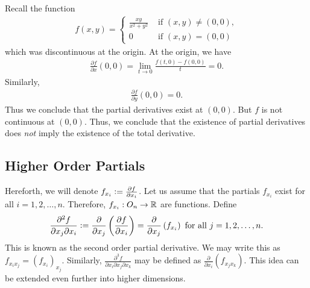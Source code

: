 \begin{example}
    Recall the function
    \begin{align}
        f(x,y) = \begin{cases}
            \frac{xy}{x^{2}+y^{2}} &\text{ if } (x,y) \neq (0,0),\\
            0 &\text{ if } (x,y) = (0,0)
        \end{cases}
    \end{align}
    which was discontinuous at the origin. At the origin, we have
    \begin{align}
        \frac{\partial f}{\partial x}(0,0) = \lim_{t \to 0} \frac{f(t,0)-f(0,0)}{t} = 0.
    \end{align}
    Similarly,
    \begin{align}
        \frac{\partial f}{\partial y}(0,0) = 0.
    \end{align}
    Thus we conclude that the partial derivatives exist at $(0,0)$. But $f$ is not continuous at $(0,0)$. Thus, we conclude that the existence of partial derivatives does \textit{not} imply the existence of the total derivative.
\end{example}


\subsection{Higher Order Partials}
Hereforth, we will denote $f_{x_{i}} \vcentcolon= \frac{\partial f}{\partial x_{i}}$. Let us assume that the partials $f_{x_{i}}$ exist for all $i = 1,2,\ldots,n$. Therefore, $f_{x_{i}} : O_{n} \to \mathbb{R}$ are functions. Define
\begin{align}
    \frac{\partial^{2} f}{\partial x_{j} \partial x_{i}} \vcentcolon= \frac{\partial}{\partial x_{j}} \left( \frac{\partial f}{\partial x_{i}} \right) = \frac{\partial}{\partial x_{j}} \left( f_{x_{i}} \right) \text{ for all } j = 1,2,\ldots,n.
\end{align}
This is known as the second order partial derivative. We may write this as $f_{x_{i}x_{j}} = (f_{x_{i}})_{x_{j}}$. Similarly, $\frac{\partial^{3} f}{\partial x_{i} \partial x_{j} \partial x_{k}}$ may be defined as $\frac{\partial}{\partial x_{i}} (f_{x_{j}x_{k}})$. This idea can be extended even further into higher dimensions.

